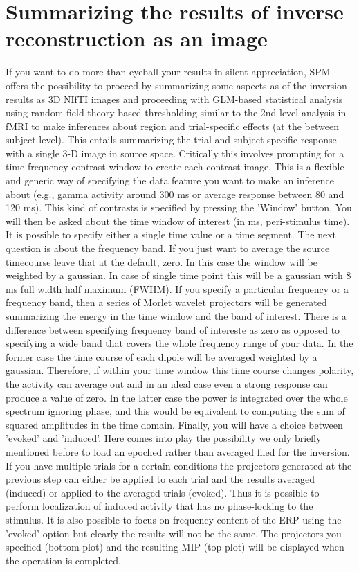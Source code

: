 \section{Summarizing the results of inverse reconstruction as an image}
If you want to do more than eyeball your results in silent appreciation, SPM offers the possibility to proceed by summarizing some aspects
as of the inversion results as 3D NIfTI images and proceeding with GLM-based statistical analysis using random field theory based thresholding similar
to the 2nd level analysis in fMRI to make inferences about region and trial-specific effects (at the between subject level).
This entails summarizing the trial and subject specific response with a single 3-D 
image in source space. Critically this involves prompting for a time-frequency contrast window to create each contrast image.
This is a flexible and generic way of specifying the data feature you want to make an inference about (e.g., gamma activity around 300 
ms or average response between 80 and 120 ms). This kind of contrasts is specified by pressing the 'Window' button. You will then be asked about
the time window of interest (in ms, peri-stimulus time). It is possible to specify either a single time value or a time segment. The next question is about the frequency band.
If you just want to average the source timecourse leave that at the default, zero. In this case the window will
be weighted by a gaussian. In case of single time point this will be a gaussian with 8 ms full width half maximum (FWHM). 
If you specify a particular frequency or a frequency band, then a series of Morlet wavelet projectors
will be generated summarizing the energy in the time window and the band of interest. There is a difference between specifying frequency band of intereste as zero as opposed
to specifying a wide band that covers the whole frequency range of your data. In the former case the time course of each dipole will be averaged weighted by a gaussian. Therefore,
if within your time window this time course changes polarity, the activity can average out and in an ideal case even a strong response can produce a value of zero. In the latter case
the power is integrated over the whole spectrum ignoring phase, and this would be equivalent to computing the sum of squared amplitudes in the time domain. 
Finally, you will have a choice between 'evoked' and 'induced'. Here comes into play
the possibility we only briefly mentioned before to load an epoched rather than averaged filed for the inversion. If you have multiple trials for a certain conditions
the projectors generated at the previous step can either be applied to each trial and the results averaged (induced) or applied to the averaged trials (evoked). Thus it is
possible to perform localization of induced activity that has no phase-locking to the stimulus. It is also possible to focus on frequency content of the ERP using the 'evoked'
option but clearly the results will not be the same. The projectors you specified (bottom plot) and the resulting MIP (top plot) will be displayed when the operation is completed.

